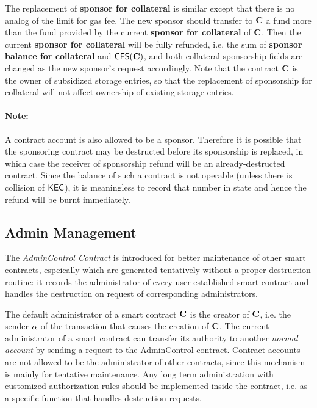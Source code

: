 The replacement of \textbf{sponsor for collateral} is similar except that there is no analog of the limit for gas fee.
The new sponsor should transfer to $\mathbf{C}$ a fund more than the fund provided by the current \textbf{sponsor for collateral} of $\mathbf{C}$.
Then the current \textbf{sponsor for collateral} will be fully refunded, i.e. the sum of \textbf{sponsor balance for collateral} and $\mathsf{CFS}(\mathbf{C})$,
and both collateral sponsorship fields are changed as the new sponsor's request accordingly.
Note that the contract $\mathbf{C}$ is the owner of subsidized storage entries, so that the replacement of sponsorship for collateral will not affect ownership of existing storage entries.

\paragraph{Note:} A contract account is also allowed to be a sponsor.
Therefore it is possible that the sponsoring contract may be destructed before its sponsorship is replaced,
in which case the receiver of sponsorship refund will be an already-destructed contract.
Since the balance of such a contract is not operable (unless there is collision of $\mathsf{KEC}$),
it is meaningless to record that number in state and hence the refund will be burnt immediately.


\subsection{Admin Management}
\label{sec:admin}

The \emph{AdminControl Contract} is introduced for better maintenance of other smart contracts, espeically which are generated tentatively without a proper destruction routine:
it records the administrator of every user-established smart contract and handles the destruction on request of corresponding administrators.

The default administrator of a smart contract $\mathbf{C}$ is the  creator of $\mathbf{C}$, i.e. the sender $\mathbf{\alpha}$ of the transaction that causes the creation of $\mathbf{C}$.
The current administrator of a smart contract can transfer its authority to another \emph{normal account} by sending a request to the AdminControl contract.
Contract accounts are not allowed to be the administrator of other contracts,
since this mechanism is mainly for tentative maintenance.
Any long term administration with customized authorization rules should be implemented inside the contract,
i.e. as a specific function that handles destruction requests.

